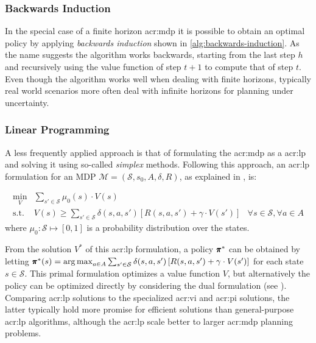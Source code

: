 \subsubsection{Backwards Induction}
\label{sec:backwards-induction}

In the special case of a finite horizon \acrshort{acr:mdp} it is possible to obtain an optimal policy by applying \textit{backwards induction} \cite{chamie2015finite} shown in \autoref{alg:backwards-induction}.
As the name suggests the algorithm works backwards, starting from the last step $h$ and recursively using the value function of step $t + 1$ to compute that of step $t$.
Even though the algorithm works well when dealing with finite horizons, typically real world scenarios more often deal with infinite horizons for planning under uncertainty.

\subsubsection{Linear Programming}
\label{sec:linear-programming}

A less frequently applied approach is that of formulating the \acrshort{acr:mdp} as a \acrfull{acr:lp} and solving it using so-called \textit{simplex} methods.
Following this approach, an \acrshort{acr:lp} formulation for an MDP $\mathcal{M} = (\mathcal{S}, s_0, A, \delta, R)$, as explained in \cite{pazis2012non}, is:

\begin{align}
\min_{V} &\sum_{s' \in \mathcal{S}} \mu_0(s) \cdot V(s) &\nonumber\\
\text{s.t. } &V(s) \geq \sum_{s' \in \mathcal{S}} \delta(s, a, s') \left[R(s,a,s') + \gamma\cdot V(s')\right]	&\forall s \in \mathcal{S}, \forall a \in A
\end{align}
where $\mu_0: \mathcal{S} \mapsto [0,1]$ is a probability distribution over the states.

From the solution $V^*$ of this \acrshort{acr:lp} formulation, a policy $\pmb{\pi}^*$ can be obtained by letting $\pmb{\pi}^*(s) = \operatorname*{arg\,max}_{a \in A} \sum_{s' \in \mathcal{S}} \delta(s, a, s') \left[R(s,a,s') + \gamma\cdot V(s')\right]$ for each state $s \in \mathcal{S}$. This primal formulation optimizes a value function $V$, but alternatively the policy can be optimized directly by considering the dual formulation (see \cite{littman1995complexity}).
Comparing \acrshort{acr:lp} solutions to the specialized \acrshort{acr:vi} and \acrshort{acr:pi} solutions, the latter typically hold more promise for efficient solutions than general-purpose \acrshort{acr:lp} algorithms, although the \acrshort{acr:lp} scale better to larger \acrshort{acr:mdp} planning problems.

